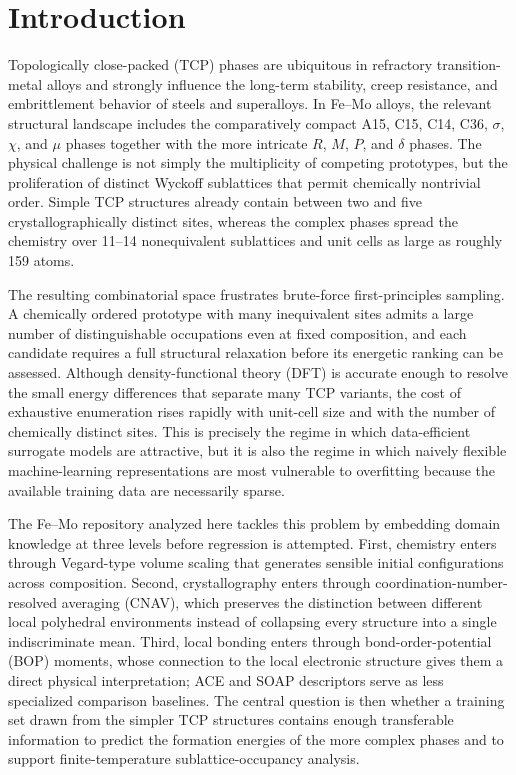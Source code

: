 \section{Introduction}
\label{sec:introduction}

Topologically close-packed (TCP) phases are ubiquitous in refractory transition-metal alloys and strongly influence the long-term stability, creep resistance, and embrittlement behavior of steels and superalloys. In Fe--Mo alloys, the relevant structural landscape includes the comparatively compact A15, C15, C14, C36, $\sigma$, $\chi$, and $\mu$ phases together with the more intricate $R$, $M$, $P$, and $\delta$ phases. The physical challenge is not simply the multiplicity of competing prototypes, but the proliferation of distinct Wyckoff sublattices that permit chemically nontrivial order. Simple TCP structures already contain between two and five crystallographically distinct sites, whereas the complex phases spread the chemistry over 11--14 nonequivalent sublattices and unit cells as large as roughly 159 atoms. %

The resulting combinatorial space frustrates brute-force first-principles sampling. A chemically ordered prototype with many inequivalent sites admits a large number of distinguishable occupations even at fixed composition, and each candidate requires a full structural relaxation before its energetic ranking can be assessed. Although density-functional theory (DFT) is accurate enough to resolve the small energy differences that separate many TCP variants, the cost of exhaustive enumeration rises rapidly with unit-cell size and with the number of chemically distinct sites. This is precisely the regime in which data-efficient surrogate models are attractive, but it is also the regime in which naively flexible machine-learning representations are most vulnerable to overfitting because the available training data are necessarily sparse. %

The Fe--Mo repository analyzed here tackles this problem by embedding domain knowledge at three levels before regression is attempted. First, chemistry enters through Vegard-type volume scaling that generates sensible initial configurations across composition. Second, crystallography enters through coordination-number-resolved averaging (CNAV), which preserves the distinction between different local polyhedral environments instead of collapsing every structure into a single indiscriminate mean. Third, local bonding enters through bond-order-potential (BOP) moments, whose connection to the local electronic structure gives them a direct physical interpretation; ACE and SOAP descriptors serve as less specialized comparison baselines. The central question is then whether a training set drawn from the simpler TCP structures contains enough transferable information to predict the formation energies of the more complex phases and to support finite-temperature sublattice-occupancy analysis.

